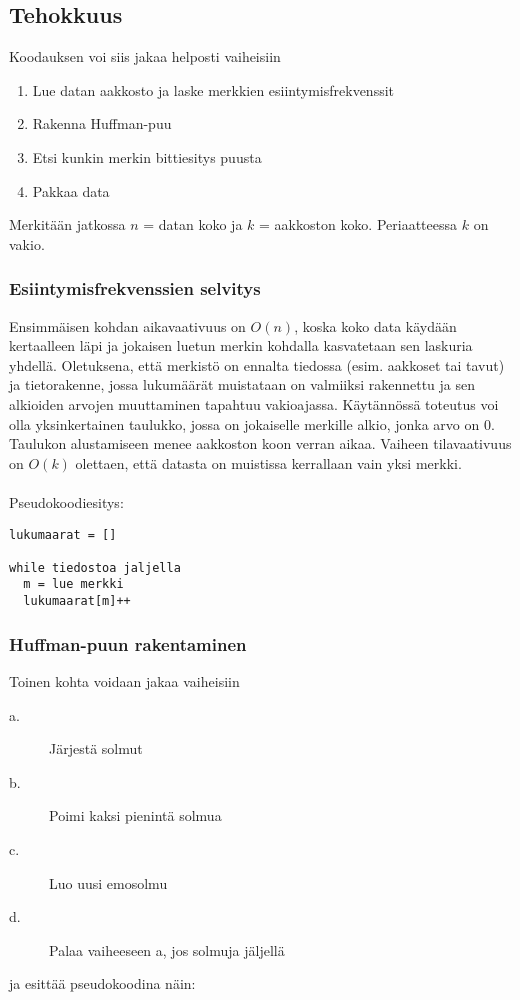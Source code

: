 \documentclass[a4paper, 12pt, finnish]{article}
\begin{document}
\subsection{Tehokkuus}

Koodauksen voi siis jakaa helposti vaiheisiin
\begin{enumerate}
\item Lue datan aakkosto ja laske merkkien esiintymisfrekvenssit
\item Rakenna Huffman-puu
\item Etsi kunkin merkin bittiesitys puusta
\item Pakkaa data
\end{enumerate}
Merkitään jatkossa $n$ = datan koko ja $k$ = aakkoston koko. Periaatteessa $k$ on vakio.
\\

\subsubsection{Esiintymisfrekvenssien selvitys}
Ensimmäisen kohdan aikavaativuus on $O(n)$, koska koko data käydään kertaalleen läpi ja jokaisen luetun merkin kohdalla kasvatetaan sen laskuria yhdellä. Oletuksena, että merkistö on ennalta tiedossa (esim. aakkoset tai tavut) ja tietorakenne, jossa lukumäärät muistataan on valmiiksi rakennettu ja sen alkioiden arvojen muuttaminen tapahtuu vakioajassa. Käytännössä toteutus voi olla yksinkertainen taulukko, jossa on jokaiselle merkille alkio, jonka arvo on 0. Taulukon alustamiseen menee aakkoston koon verran aikaa. Vaiheen tilavaativuus on $O(k)$ olettaen, että datasta on muistissa kerrallaan vain yksi merkki.
\\\\
Pseudokoodiesitys:


\begin{lstlisting}
lukumaarat = []

while tiedostoa jaljella
  m = lue merkki
  lukumaarat[m]++

\end{lstlisting}
\subsubsection{Huffman-puun rakentaminen}
Toinen kohta voidaan jakaa vaiheisiin
\begin{description}
\item[a.] Järjestä solmut
\item[b.] Poimi kaksi pienintä solmua
\item[c.] Luo uusi emosolmu
\item[d.] Palaa vaiheeseen a, jos solmuja jäljellä
\end{description}
\vspace{1\baselineskip}\vspace{-\parskip}
ja esittää pseudokoodina näin:
\end{document}
